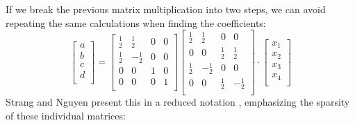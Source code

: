 \documentclass[letterpaper]{article}
\begin{document}
If we break the previous matrix multiplication into two steps, we can avoid repeating the same calculations when finding the coefficients:
\[
\begin{bmatrix}
a \\
b \\
c \\
d \\
\end{bmatrix}
=
\begin{bmatrix}
^1_2                 &   ^1_2                 &   0                   &  0                    \\
^1_2                 &  -^1_2                 &   0                   &  0                    \\
0                    &   0                    &   1                   &  0                    \\
0                    &   0                    &   0                   &  1                    \\
\end{bmatrix}
\begin{bmatrix}
^1_2                 &   ^1_2                 &   0                   &  0                    \\
0                    &   0                    &   ^1_2                &  ^1_2                 \\
^1_2                 &  -^1_2                 &   0                   &  0                    \\
0                    &   0                    &  ^1_2                 & -^1_2                 \\
\end{bmatrix}
\cdot
\begin{bmatrix}
x_1 \\
x_2 \\
x_3 \\
x_4 \\
\end{bmatrix}
\]
Strang and Nguyen present this in a reduced notation \cite[p.~31]{strang}, emphasizing the sparsity of these individual matrices:
\end{document}
